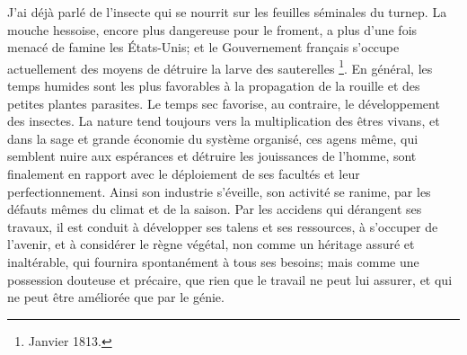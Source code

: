 J'ai déjà parlé de l'insecte qui se nourrit sur les feuilles séminales du turnep.
La mouche hessoise, encore plus dangereuse pour le froment, a plus d'une fois menacé de famine les États-Unis; et le Gouvernement français s'occupe actuellement des moyens de détruire la larve des sauterelles \footnote{Janvier 1813.}.\setcounter{page}{139} En général, les temps humides sont les plus favorables à la propagation de la rouille et des petites plantes parasites. Le temps sec favorise, au contraire, le développement des insectes. La nature tend toujours vers la multiplication des êtres vivans, et dans la sage et grande économie du système organisé, ces agens même, qui semblent nuire aux espérances et détruire les jouissances de l'homme, sont finalement en rapport avec le déploiement de ses facultés et leur perfectionnement. Ainsi son industrie s'éveille, son activité se ranime, par les défauts mêmes du climat et de la saison. Par les accidens qui dérangent ses travaux, il est conduit à développer ses talens et ses ressources, à s'occuper de l'avenir, et à considérer le règne végétal, non comme un héritage assuré et inaltérable, qui fournira spontanément à tous ses besoins; mais comme une possession douteuse et précaire, que rien que le travail ne peut lui assurer, et qui ne peut être améliorée que par le génie.